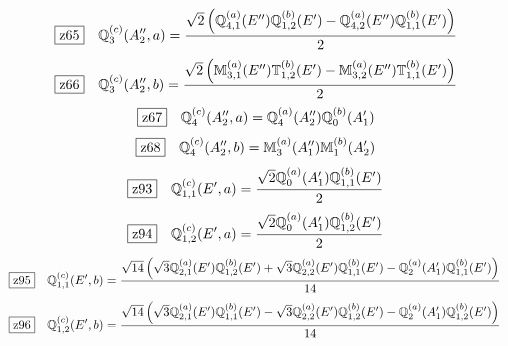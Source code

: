 \documentclass[fleqn,10pt,landscape]{jsarticle}
\begin{document}
\begin{dmath*}
\hspace*{3mm}\fbox{z65}\quad \mathbb{Q}_{3}^{(c)}(A_{2}^{\prime\prime},a)=\frac{\sqrt{2} \left(\mathbb{Q}_{4,1}^{(a)}(E^{\prime\prime}) \mathbb{Q}_{1,2}^{(b)}(E^{\prime}) - \mathbb{Q}_{4,2}^{(a)}(E^{\prime\prime}) \mathbb{Q}_{1,1}^{(b)}(E^{\prime})\right)}{2}
\end{dmath*}
\begin{dmath*}
\hspace*{3mm}\fbox{z66}\quad \mathbb{Q}_{3}^{(c)}(A_{2}^{\prime\prime},b)=\frac{\sqrt{2} \left(\mathbb{M}_{3,1}^{(a)}(E^{\prime\prime}) \mathbb{T}_{1,2}^{(b)}(E^{\prime}) - \mathbb{M}_{3,2}^{(a)}(E^{\prime\prime}) \mathbb{T}_{1,1}^{(b)}(E^{\prime})\right)}{2}
\end{dmath*}
\begin{dmath*}
\hspace*{3mm}\fbox{z67}\quad \mathbb{Q}_{4}^{(c)}(A_{2}^{\prime\prime},a)=\mathbb{Q}_{4}^{(a)}(A_{2}^{\prime\prime}) \mathbb{Q}_{0}^{(b)}(A_{1}^{\prime})
\end{dmath*}
\begin{dmath*}
\hspace*{3mm}\fbox{z68}\quad \mathbb{Q}_{4}^{(c)}(A_{2}^{\prime\prime},b)=\mathbb{M}_{3}^{(a)}(A_{1}^{\prime\prime}) \mathbb{M}_{1}^{(b)}(A_{2}^{\prime})
\end{dmath*}
\begin{dmath*}
\hspace*{3mm}\fbox{z93}\quad \mathbb{Q}_{1,1}^{(c)}(E^{\prime},a)=\frac{\sqrt{2} \mathbb{Q}_{0}^{(a)}(A_{1}^{\prime}) \mathbb{Q}_{1,1}^{(b)}(E^{\prime})}{2}
\end{dmath*}
\begin{dmath*}
\hspace*{3mm}\fbox{z94}\quad \mathbb{Q}_{1,2}^{(c)}(E^{\prime},a)=\frac{\sqrt{2} \mathbb{Q}_{0}^{(a)}(A_{1}^{\prime}) \mathbb{Q}_{1,2}^{(b)}(E^{\prime})}{2}
\end{dmath*}
\begin{dmath*}
\hspace*{3mm}\fbox{z95}\quad \mathbb{Q}_{1,1}^{(c)}(E^{\prime},b)=\frac{\sqrt{14} \left(\sqrt{3} \mathbb{Q}_{2,1}^{(a)}(E^{\prime}) \mathbb{Q}_{1,2}^{(b)}(E^{\prime}) + \sqrt{3} \mathbb{Q}_{2,2}^{(a)}(E^{\prime}) \mathbb{Q}_{1,1}^{(b)}(E^{\prime}) - \mathbb{Q}_{2}^{(a)}(A_{1}^{\prime}) \mathbb{Q}_{1,1}^{(b)}(E^{\prime})\right)}{14}
\end{dmath*}
\begin{dmath*}
\hspace*{3mm}\fbox{z96}\quad \mathbb{Q}_{1,2}^{(c)}(E^{\prime},b)=\frac{\sqrt{14} \left(\sqrt{3} \mathbb{Q}_{2,1}^{(a)}(E^{\prime}) \mathbb{Q}_{1,1}^{(b)}(E^{\prime}) - \sqrt{3} \mathbb{Q}_{2,2}^{(a)}(E^{\prime}) \mathbb{Q}_{1,2}^{(b)}(E^{\prime}) - \mathbb{Q}_{2}^{(a)}(A_{1}^{\prime}) \mathbb{Q}_{1,2}^{(b)}(E^{\prime})\right)}{14}
\end{dmath*}
\end{document}
